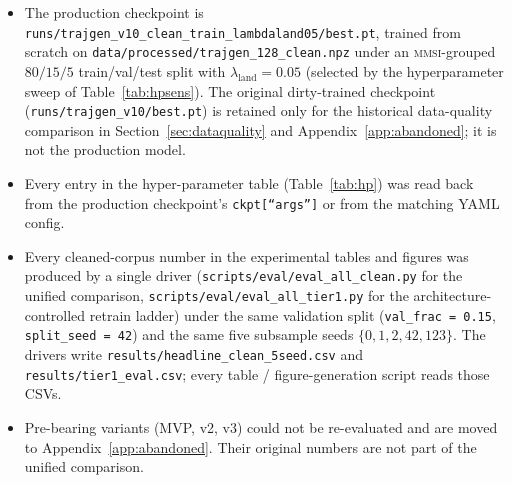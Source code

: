 \documentclass[oneside, a4paper, onecolumn, 11pt]{article}
\begin{document}
\begin{itemize}[leftmargin=*]
  \item The production checkpoint is
        \texttt{runs/trajgen\_v10\_clean\_train\_lambdaland05/best.pt},
        trained from scratch on
        \texttt{data/processed/trajgen\_128\_clean.npz} under an
        \textsc{mmsi}-grouped $80/15/5$ train/val/test split with
        $\lambda_{\mathrm{land}} = 0.05$ (selected by the
        hyperparameter sweep of Table~\ref{tab:hpsens}).  The
        original dirty-trained checkpoint
        (\texttt{runs/trajgen\_v10/best.pt}) is retained only for
        the historical data-quality comparison in
        Section~\ref{sec:dataquality} and Appendix~\ref{app:abandoned};
        it is not the production model.
  \item Every entry in the hyper-parameter table
        (Table~\ref{tab:hp}) was read back from the production
        checkpoint's \texttt{ckpt[``args'']} or from the matching
        YAML config.
  \item Every cleaned-corpus number in the experimental tables and
        figures was produced by a single driver
        (\texttt{scripts/eval/eval\_all\_clean.py} for the unified
        comparison, \texttt{scripts/eval/eval\_all\_tier1.py} for
        the architecture-controlled retrain ladder) under the same
        validation split (\texttt{val\_frac = 0.15},
        \texttt{split\_seed = 42}) and the same five subsample
        seeds $\{0, 1, 2, 42, 123\}$.  The drivers write
        \texttt{results/headline\_clean\_5seed.csv} and
        \texttt{results/tier1\_eval.csv}; every table /
        figure-generation script reads those CSVs.
  \item Pre-bearing variants (MVP, v2, v3) could not be re-evaluated
        and are moved to Appendix~\ref{app:abandoned}.  Their
        original numbers are not part of the unified comparison.
\end{itemize}

\newpage


\end{document}
